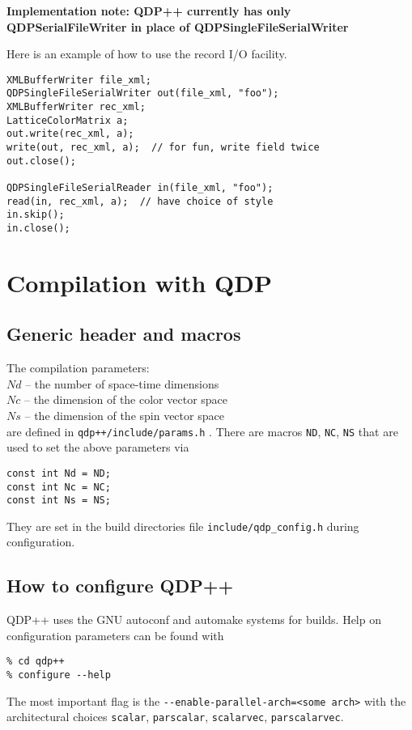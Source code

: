 \documentclass[12pt,letterpaper]{article}
\begin{document}
{\bf Implementation note: QDP++ currently has only QDPSerialFileWriter in place
of QDPSingleFileSerialWriter}

%
Here is an example of how to use the record I/O facility.
%
\begin{small}
\begin{verbatim}
XMLBufferWriter file_xml;
QDPSingleFileSerialWriter out(file_xml, "foo");
XMLBufferWriter rec_xml;
LatticeColorMatrix a;
out.write(rec_xml, a);
write(out, rec_xml, a);  // for fun, write field twice
out.close();

QDPSingleFileSerialReader in(file_xml, "foo");
read(in, rec_xml, a);  // have choice of style
in.skip();
in.close();
\end{verbatim}
\end{small}


\newpage

\section{Compilation with QDP}

\subsection{Generic header and macros}

The compilation parameters:\\
\noindent
$Nd$ -- the number of space-time dimensions\\
\noindent
$Nc$ -- the dimension of the color vector space\\
\noindent
$Ns$ -- the dimension of the spin vector space\\
\noindent
are defined in {\tt qdp++/include/params.h} . 
There are macros {\tt ND}, {\tt NC},
{\tt NS} that are used to set the above parameters via
\begin{verbatim}
const int Nd = ND;
const int Nc = NC;
const int Ns = NS;
\end{verbatim}
%
\noindent
They are set in the build directories file {\tt include/qdp\_config.h} 
during configuration.

\subsection{How to configure QDP++}

QDP++ uses the GNU autoconf and automake systems for builds. Help on
configuration parameters can be found with
\begin{verbatim}
% cd qdp++
% configure --help
\end{verbatim}
%
The most important flag is the \verb|--enable-parallel-arch=<some arch>|
with the architectural choices \verb|scalar|, \verb|parscalar|, \verb|scalarvec|,
\verb|parscalarvec|.
\end{document}
